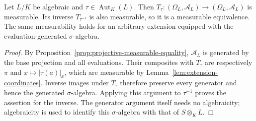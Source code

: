 \begin{proposition}
\label{prop:automorphism-measurable}
\leanok
Let $L/K$ be algebraic and $\tau\in\operatorname{Aut}_K(L)$.
Then $T_\tau:(\Omega_L,\mathcal A_L)\to(\Omega_L,\mathcal A_L)$
is measurable. Its inverse $T_{\tau^{-1}}$ is also measurable, so it
is a measurable equivalence. The same measurability holds for an
arbitrary extension equipped with the evaluation-generated $\sigma$-algebra.
\end{proposition}
\begin{proof}
By Proposition~\ref{prop:projective-measurable-equality}, $\mathcal A_L$
is generated by the base projection and all evaluations.
Their composites with $T_\tau$ are respectively $\pi$ and
$x\mapsto|\tau(a)|_x$, which are measurable by
Lemma~\ref{lem:extension-coordinates}. Inverse images under $T_\tau$
therefore preserve every generator and hence the generated $\sigma$-algebra.
Applying this argument to $\tau^{-1}$ proves the assertion for the inverse.
The generator argument itself needs no algebraicity; algebraicity is used
to identify this $\sigma$-algebra with that of $S\otimes_K L$.
\end{proof}

